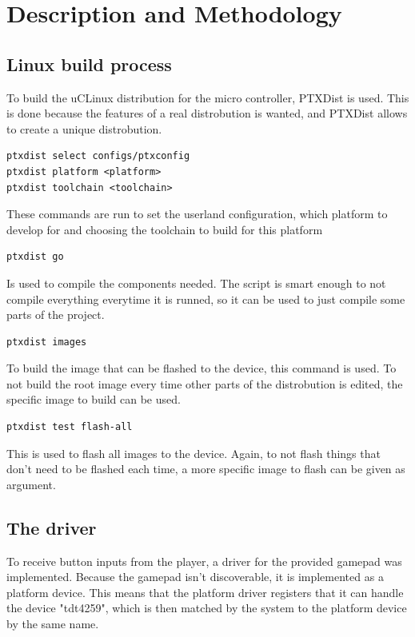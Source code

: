 \section{Description and Methodology}

\subsection{Linux build process}
To build the uCLinux distribution for the micro controller, PTXDist is used.\cite{ptxdistguru}
This is done because the features of a real distrobution is wanted, and PTXDist
allows to create a unique distrobution.

\begin{verbatim}
ptxdist select configs/ptxconfig
ptxdist platform <platform>
ptxdist toolchain <toolchain>
\end{verbatim}

These commands are run to set the userland configuration, which platform to
develop for and choosing the toolchain to build for this platform

\begin{verbatim}
ptxdist go
\end{verbatim}

Is used to compile the components needed. The script is smart enough to not
compile everything everytime it is runned, so it can be used to just compile
some parts of the project.

\begin{verbatim}
ptxdist images
\end{verbatim}

To build the image that can be flashed to the device, this command is used. To
not build the root image every time other parts of the distrobution is edited,
the specific image to build can be used.

\begin{verbatim}
ptxdist test flash-all
\end{verbatim}

This is used to flash all images to the device. Again, to not flash things that
don't need to be flashed each time, a more specific image to flash can be given
as argument.



\subsection{The driver}

To receive button inputs from the player, a driver for the
provided gamepad was implemented. Because the gamepad isn't discoverable, it is
implemented as a platform device. This means that the platform driver
\footnotemark registers that it can handle the device "tdt4259", which is then
matched by the system to the platform device by the same name.

